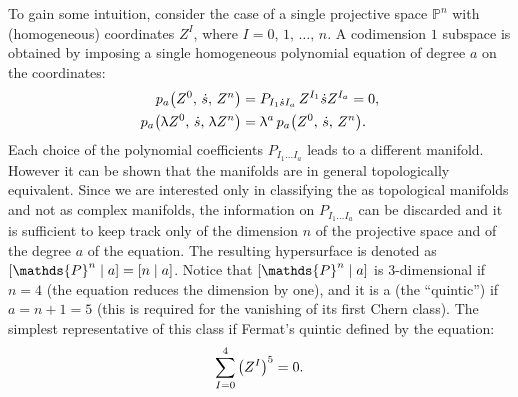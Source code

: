 To gain some intuition, consider the case of a single projective space $\mathds{P}^n$ with (homogeneous) coordinates $Z^I$, where $I = 0,\, 1,\, \dots,\, n$.
A codimension $1$ subspace is obtained by imposing a single homogeneous polynomial equation of degree $a$ on the coordinates:
\begin{equation}
  \begin{split}
    p_a\qty(Z^0,\, \dot{s},\, Z^n)
    & =
    P_{I_1 \dot{s} I_a}\, Z^{I_1} \dot{s} Z^{I_a}
    = 0,
    \\
    p_a\qty(\uplambda Z^0,\, \dot{s},\, \uplambda Z^n)
    & =
    \uplambda^a \, p_a\qty(Z^0,\, \dot{s},\, Z^n).
  \end{split}
\end{equation}
Each choice of the polynomial coefficients $P_{I_1 \dots I_a}$ leads to a different manifold.
However it can be shown that the manifolds are in general topologically equivalent.
Since we are interested only in classifying the \cy as topological manifolds and not as complex manifolds, the information on $P_{I_1 \dots I_a}$ can be discarded and it is sufficient to keep track only of the dimension $n$ of the projective space and of the degree $a$ of the equation.
The resulting hypersurface is denoted as $\qty[\mathds{P}^n \mid a] = \qty[n \mid a]$.
Notice that $\qty[\mathds{P}^n \mid a]$ is $3$-dimensional if $n = 4$ (the equation reduces the dimension by one), and it is a \cy (the ``quintic'') if $a = n + 1 = 5$ (this is required for the vanishing of its first Chern class).
The simplest representative of this class if Fermat's quintic defined by the equation:
\begin{equation}
  \sum\limits_{I = 0}^{4} \qty( Z^I )^5 = 0.
\end{equation}


